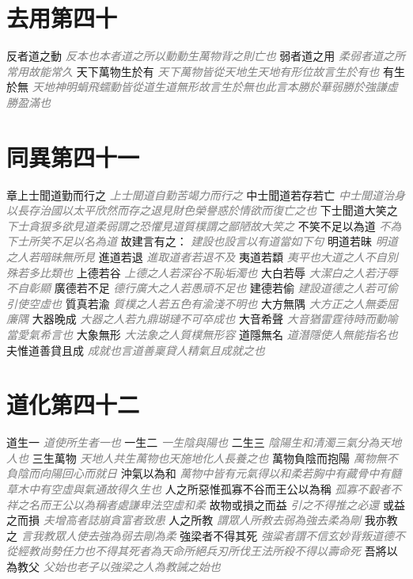 \documentclass[a4paper,zihao=-4,oneside,landscape,UTF8]{ctexart}
\newcommand{\zhushi}[1]{\scriptsize{\textit{\textcolor{gray}{#1}}}\normalsize}
\begin{document}
\section{去用第四十}

反者道之動
\zhushi{反本也本者道之所以動動生萬物背之則亡也}
弱者道之用
\zhushi{柔弱者道之所常用故能常久}
天下萬物生於有
\zhushi{天下萬物皆從天地生天地有形位故言生於有也}
有生於無
\zhushi{天地神明蜎飛蠕動皆從道生道無形故言生於無也此言本勝於華弱勝於強謙虛勝盈滿也}


\section{同異第四十一}

章上士聞道勤而行之
\zhushi{上士聞道自勤苦竭力而行之}
中士聞道若存若亡
\zhushi{中士聞道治身以長存治國以太平欣然而存之退見財色榮譽惑於情欲而復亡之也}
下士聞道大笑之
\zhushi{下士貪狠多欲見道柔弱謂之恐懼見道質樸謂之鄙陋故大笑之}
不笑不足以為道
\zhushi{不為下士所笑不足以名為道}
故建言有之：
\zhushi{建設也設言以有道當如下句}
明道若昧
\zhushi{明道之人若暗昧無所見}
進道若退
\zhushi{進取道者若退不及}
夷道若纇
\zhushi{夷平也大道之人不自別殊若多比類也}
上德若谷
\zhushi{上德之人若深谷不恥垢濁也}
大白若辱
\zhushi{大潔白之人若汙辱不自彰顯}
廣德若不足
\zhushi{德行廣大之人若愚頑不足也}
建德若偷
\zhushi{建設道德之人若可偷引使空虛也}
質真若渝
\zhushi{質樸之人若五色有渝淺不明也}
大方無隅
\zhushi{大方正之人無委屈廉隅}
大器晚成
\zhushi{大器之人若九鼎瑚璉不可卒成也}
大音希聲
\zhushi{大音猶雷霆待時而動喻當愛氣希言也}
大象無形
\zhushi{大法象之人質樸無形容}
道隱無名
\zhushi{道潛隱使人無能指名也}
夫惟道善貸且成
\zhushi{成就也言道善稟貸人精氣且成就之也}


\section{道化第四十二}

道生一
\zhushi{道使所生者一也}
一生二
\zhushi{一生陰與陽也}
二生三
\zhushi{陰陽生和清濁三氣分為天地人也}
三生萬物
\zhushi{天地人共生萬物也天施地化人長養之也}
萬物負陰而抱陽
\zhushi{萬物無不負陰而向陽回心而就日}
沖氣以為和
\zhushi{萬物中皆有元氣得以和柔若胸中有藏骨中有髓草木中有空虛與氣通故得久生也}
人之所惡惟孤寡不谷而王公以為稱
\zhushi{孤寡不轂者不祥之名而王公以為稱者處謙卑法空虛和柔}
故物或損之而益
\zhushi{引之不得推之必還}
或益之而損
\zhushi{夫增高者誌崩貪富者致患}
人之所教
\zhushi{謂眾人所教去弱為強去柔為剛}
我亦教之
\zhushi{言我教眾人使去強為弱去剛為柔}
強梁者不得其死
\zhushi{強粱者謂不信玄妙背叛道德不從經教尚勢任力也不得其死者為天命所絕兵刃所伐王法所殺不得以壽命死}
吾將以為教父
\zhushi{父始也老子以強梁之人為教誡之始也}
\end{document}
